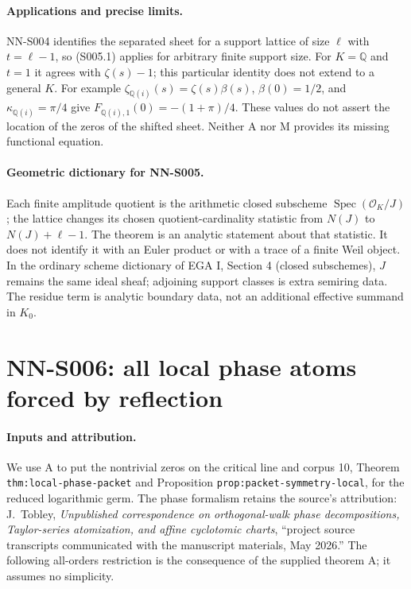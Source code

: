 \paragraph{Applications and precise limits.}
NN-S004 identifies the separated sheet for a support lattice of
size $\ell$ with $t=\ell-1$, so (S005.1) applies for arbitrary
finite support size. For $K=\mathbb Q$ and $t=1$ it agrees with
$\zeta(s)-1$; this particular identity does not extend to a
general $K$. For example $\zeta_{\mathbb Q(i)}(s)=\zeta(s)\beta(s)$,
$\beta(0)=1/2$, and $\kappa_{\mathbb Q(i)}=\pi/4$ give
$F_{\mathbb Q(i),1}(0)=-(1+\pi)/4$. These values do not assert
the location of the zeros of the shifted sheet. Neither A nor M
provides its missing functional equation.

\paragraph{Geometric dictionary for NN-S005.}
Each finite amplitude quotient is the arithmetic closed
subscheme $\operatorname{Spec}(\mathcal O_K/J)$; the lattice
changes its chosen quotient-cardinality statistic from $N(J)$ to
$N(J)+\ell-1$. The theorem is an analytic statement about that
statistic. It does not identify it with an Euler product or with
a trace of a finite Weil object. In the ordinary scheme dictionary
of EGA I, Section 4 (closed subschemes), $J$ remains the same
ideal sheaf; adjoining support classes is extra semiring data.
The residue term is analytic boundary data, not an additional
effective summand in $K_0$.

\section{NN-S006: all local phase atoms forced by reflection}
\label{sec:NN-S006}

\paragraph{Inputs and attribution.}
We use A to put the nontrivial zeros on the critical line and
corpus 10, Theorem \texttt{thm:local-phase-packet} and Proposition
\texttt{prop:packet-symmetry-local}, for the reduced logarithmic
germ. The phase formalism retains the source's attribution:
J.~Tobley, \emph{Unpublished correspondence on orthogonal-walk
phase decompositions, Taylor-series atomization, and affine
cyclotomic charts}, ``project source transcripts communicated with
the manuscript materials, May 2026.'' The following
all-orders restriction is the consequence of the supplied theorem
A; it assumes no simplicity.

